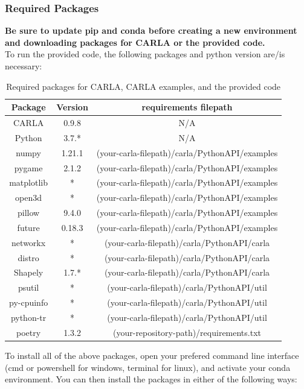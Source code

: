 \documentclass{article}
\begin{document}
\subsubsection{Required Packages}
\label{subsec:Requirements}
\textbf{Be sure to update pip and conda before creating a new environment and downloading packages for CARLA or the provided code.} \\
To run the provided code, the following packages and python version are/is necessary:
\begin{table}[h]
\centering
 \begin{tabular}{| c | c | c |}
 \hline
 Package & Version & requirements filepath \\
 \hline 
CARLA & 0.9.8 & N/A \\
 Python & 3.7.* & N/A \\
 numpy & 1.21.1 & (your-carla-filepath)/carla/PythonAPI/examples \\
 pygame & 2.1.2 & (your-carla-filepath)/carla/PythonAPI/examples \\
 matplotlib & * & (your-carla-filepath)/carla/PythonAPI/examples \\
 open3d & * & (your-carla-filepath)/carla/PythonAPI/examples \\
 pillow & 9.4.0 & (your-carla-filepath)/carla/PythonAPI/examples \\
 future & 0.18.3 & (your-carla-filepath)/carla/PythonAPI/examples \\
 networkx & * & (your-carla-filepath)/carla/PythonAPI/carla \\
 distro & * & (your-carla-filepath)/carla/PythonAPI/carla \\
 Shapely & 1.7.* & (your-carla-filepath)/carla/PythonAPI/carla \\
 psutil & * &  (your-carla-filepath)/carla/PythonAPI/util \\
 py-cpuinfo & * & (your-carla-filepath)/carla/PythonAPI/util \\
 python-tr & * & (your-carla-filepath)/carla/PythonAPI/util \\
 poetry & 1.3.2 & (your-repository-path)/requirements.txt \\
 \hline
 \end{tabular}
\caption{Required packages for CARLA, CARLA examples, and the provided code}
\label{table:RequirementsTable}
\end{table}

To install all of the above packages, open your prefered command line interface (cmd or powershell for windows, terminal for linux), and activate your conda environment. You can then install the packages in either of the following ways:
\end{document}
